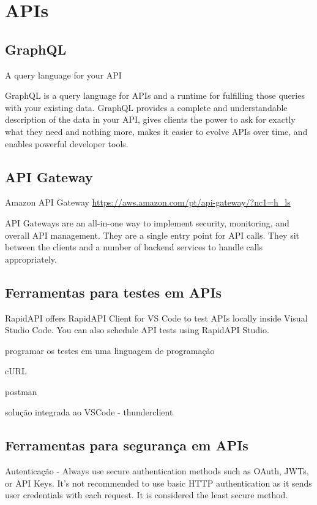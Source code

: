 \section{APIs}

\subsection{GraphQL}

A query language for your API

GraphQL is a query language for APIs and a runtime for fulfilling those queries with your existing data. GraphQL provides a complete and understandable description of the data in your API, gives clients the power to ask for exactly what they need and nothing more, makes it easier to evolve APIs over time, and enables powerful developer tools. \cite{GraphQL-site}

\subsection{API Gateway}

Amazon API Gateway \url{https://aws.amazon.com/pt/api-gateway/?nc1=h_ls}

API Gateways are an all-in-one way to implement security, monitoring, and overall API management. They are a single entry point for API calls. They sit between the clients and a number of backend services to handle calls appropriately.

\subsection{Ferramentas para testes em APIs}\label{ferramentas-testes-apis}

RapidAPI offers RapidAPI Client for VS Code to test APIs locally inside Visual Studio Code. You can also schedule API tests using RapidAPI Studio.

programar os testes em uma linguagem de programação

cURL

postman

solução integrada ao VSCode - thunderclient

\subsection{Ferramentas para segurança em APIs}

Autenticação - Always use secure authentication methods such as OAuth, JWTs, or API Keys. It's not recommended to use basic HTTP authentication as it sends user credentials with each request. It is considered the least secure method.

